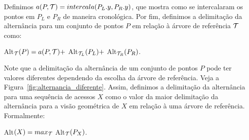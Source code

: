 Definimos $a(P,\mathcal{T}) = intercala(P_L.y, P_R.y)$, que mostra como se intercalaram os pontos em $P_L$ e $P_R$ de maneira cronológica. Por fim, definimos a delimitação da alternância para um conjunto de pontos $P$ em relação à árvore de referência $\mathcal{T}$ como:

Alt$_{\mathcal{T}}(P) = a(P,\mathcal{T}) +$ Alt$_{\mathcal{T}_L}(P_L) + $ Alt$_{\mathcal{T}_R}(P_R)$.

Note que a delimitação da alternância de um conjunto de pontos $P$ pode ter valores diferentes dependendo da escolha da árvore de referência. Veja a Figura~\ref{fig:alternancia_diferente}. Assim, definimos a delimitação da alternância para uma sequência de acessos $X$ como o valor da maior delimitação da alternância para a visão geométrica de $X$ em relação à uma árvore de referência. Formalmente: 

Alt$(X) = max_{\mathcal{T}}$ Alt$_{\mathcal{T}}(P_X)$.

